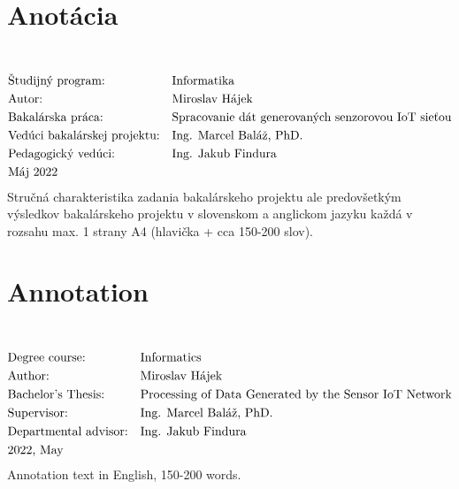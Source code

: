 \thispagestyle{empty}
\section*{Anotácia}
\University \\
\uppercase{\Faculty}
\vspace{-8pt}
\begin{align*}
& \text{Študijný program:} && \text{\StudyProgramme} \\
& \text{Autor:} && \text{\Author} \\
& \text{\Thesis:} && \text{\Title} \\
& \text{Vedúci bakalárskej projektu:} && \text{\Supervisor} \\
& \text{Pedagogický vedúci:} && \text{\PedagogicalSupervisor} \\
& \text{\Date}
\end{align*}
Stručná charakteristika zadania bakalárskeho projektu ale predovšetkým výsledkov bakalárskeho projektu v slovenskom a anglickom jazyku každá v rozsahu max. 1 strany A4 (hlavička + cca 150-200 slov).
\emptypage

\thispagestyle{empty}
\section*{Annotation}
\UniversityEN \\
\uppercase{\FacultyEN}
\vspace{-8pt}
\begin{align*}
& \text{Degree course:} && \text{\StudyProgrammeEN} \\
& \text{Author:} && \text{\Author} \\
& \text{\ThesisEN:} && \text{\TitleEN} \\
& \text{Supervisor:} && \text{\Supervisor} \\
& \text{Departmental advisor:} && \text{\PedagogicalSupervisor} \\
& \text{\DateEN}
\end{align*}
Annotation text in English, 150-200 words.
\emptypage 
